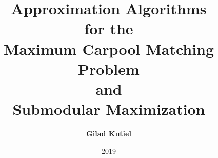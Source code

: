 \title{
Approximation Algorithms 
\\
for the
\\
Maximum Carpool Matching Problem
\\
and 
\\
Submodular Maximization
}
\author[shortname]{
    \textbf{Gilad Kutiel}
}
\date{2019}

